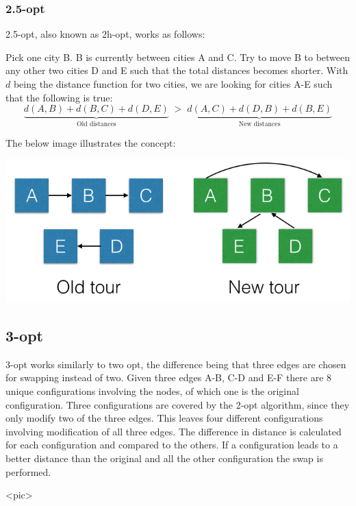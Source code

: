 \documentclass[paper=a4, fontsize=11pt,numbers=endperiod]{scrartcl} %
\numberwithin{equation}{section} %
\numberwithin{figure}{section} %
\numberwithin{table}{section} %
\begin{document}
\subsubsection{2.5-opt}
2.5-opt, also known as 2h-opt, works as follows:

Pick one city B. B is currently between cities A and C. Try to move B to between any other two cities D and E such that the total distances becomes shorter. With $d$ being the distance function for two cities, we are looking for cities A-E such that the following is true:
\[
    \underbrace{d(A,B) + d(B,C) + d(D,E)}_\text{Old distances}\; > \;\underbrace{d(A,C) + d(D,B) + d(B,E)}_\text{New distances}
\]

The below image illustrates the concept:

\begin{center}
\includegraphics[scale=0.4]{25opt}
\end{center}

\subsection{3-opt}
3-opt works similarly to two opt, the difference being that three edges are chosen for swapping instead of two.
Given three edges A-B, C-D and E-F there are 8 unique configurations involving the nodes, of which one is the original configuration.
Three configurations are covered by the 2-opt algorithm, since they only modify two of the three edges.
This leaves four different configurations involving modification of all three edges.
The difference in distance is calculated for each configuration and compared to the others.
If a configuration leads to a better distance than the original and all the other configuration the swap is performed.

<pic>
    

\end{document}
